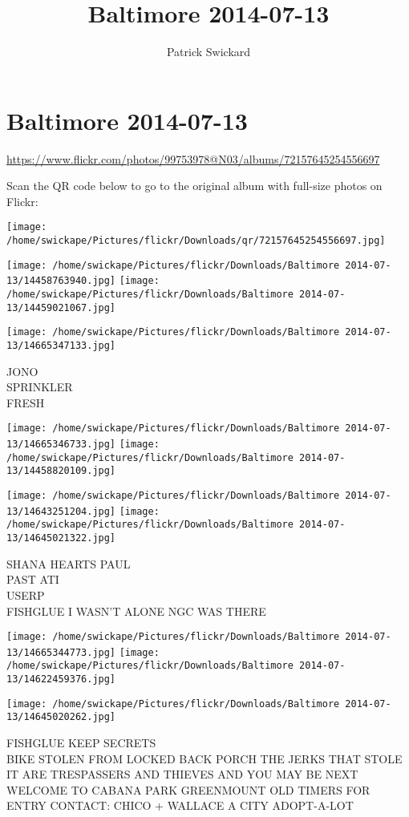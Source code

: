 \documentclass[10pt,letterpaper]{article}
\title{Baltimore 2014-07-13}
\author{Patrick Swickard}
\date{}
\begin{document}
\section*{Baltimore 2014-07-13}

\url{https://www.flickr.com/photos/99753978@N03/albums/72157645254556697}

Scan the QR code below to go to the original album with full-size photos on Flickr:

\texttt{[image: /home/swickape/Pictures/flickr/Downloads/qr/72157645254556697.jpg]}
\pagebreak

\texttt{[image: /home/swickape/Pictures/flickr/Downloads/Baltimore 2014-07-13/14458763940.jpg]}
\texttt{[image: /home/swickape/Pictures/flickr/Downloads/Baltimore 2014-07-13/14459021067.jpg]}

\vspace{0.25in}
\texttt{[image: /home/swickape/Pictures/flickr/Downloads/Baltimore 2014-07-13/14665347133.jpg]}

JONO\\
SPRINKLER\\
FRESH
\pagebreak

\texttt{[image: /home/swickape/Pictures/flickr/Downloads/Baltimore 2014-07-13/14665346733.jpg]}
\texttt{[image: /home/swickape/Pictures/flickr/Downloads/Baltimore 2014-07-13/14458820109.jpg]}

\texttt{[image: /home/swickape/Pictures/flickr/Downloads/Baltimore 2014-07-13/14643251204.jpg]}
\texttt{[image: /home/swickape/Pictures/flickr/Downloads/Baltimore 2014-07-13/14645021322.jpg]}

SHANA HEARTS PAUL\\
PAST ATI\\
USERP\\
FISHGLUE I WASN'T ALONE NGC WAS THERE
\pagebreak

\texttt{[image: /home/swickape/Pictures/flickr/Downloads/Baltimore 2014-07-13/14665344773.jpg]}
\texttt{[image: /home/swickape/Pictures/flickr/Downloads/Baltimore 2014-07-13/14622459376.jpg]}

\vspace{0.25in}
\texttt{[image: /home/swickape/Pictures/flickr/Downloads/Baltimore 2014-07-13/14645020262.jpg]}

FISHGLUE KEEP SECRETS\\
BIKE STOLEN FROM LOCKED BACK PORCH THE JERKS THAT STOLE IT ARE TRESPASSERS AND THIEVES AND YOU MAY BE NEXT\\
WELCOME TO CABANA PARK GREENMOUNT OLD TIMERS FOR ENTRY CONTACT: CHICO + WALLACE A CITY ADOPT{-}A{-}LOT
\pagebreak
\end{document}
